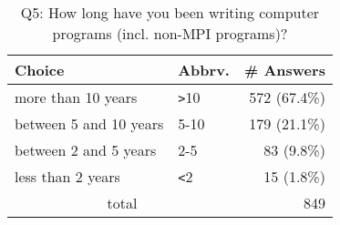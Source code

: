 \begin{table}[htb]%
\begin{center}%
\caption{Q5: How long have you been writing computer programs (incl. non-MPI programs)?}%
\label{tab:Q5-ans}%
\begin{tabular}{l|l|r}%
\hline%
Choice & Abbrv. & \# Answers \\%
\hline%
more than 10 years & \verb!>!10 & 572 (67.4\%) \\%
between 5 and 10 years & 5-10 & 179 (21.1\%) \\%
between 2 and 5 years & 2-5 & 83 (9.8\%) \\%
less than 2 years & \verb!<!2 & 15 (1.8\%) \\%
\hline%
\multicolumn{2}{c}{total} & 849 \\%
\hline%
\end{tabular}%
\end{center}%
\end{table}%
